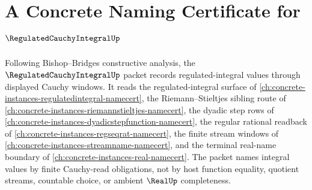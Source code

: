 \chapter{A Concrete Naming Certificate for $\RegulatedCauchyIntegralUp$}
\label{ch:concrete-instances-regulated-cauchy-integral-namecert}

Following Bishop--Bridges constructive analysis, the $\RegulatedCauchyIntegralUp$ packet records regulated-integral values through displayed Cauchy windows. It reads the regulated-integral surface of \autoref{ch:concrete-instances-regulatedintegral-namecert}, the Riemann--Stieltjes sibling route of \autoref{ch:concrete-instances-riemannstieltjes-namecert}, the dyadic step rows of \autoref{ch:concrete-instances-dyadicstepfunction-namecert}, the regular rational readback of \autoref{ch:concrete-instances-regseqrat-namecert}, the finite stream windows of \autoref{ch:concrete-instances-streamname-namecert}, and the terminal real-name boundary of \autoref{ch:concrete-instances-real-namecert}. The packet names integral values by finite Cauchy-read obligations, not by host function equality, quotient streams, countable choice, or ambient $\RealUp$ completeness.

